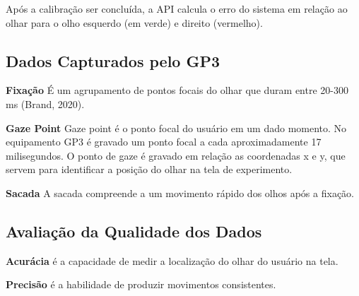 Após a calibração ser concluída, a API calcula o erro do sistema em relação ao olhar para o olho esquerdo (em verde) 
e direito (vermelho). 

\subsection{Dados Capturados pelo GP3}

\textbf{Fixação} É um agrupamento de pontos focais do olhar que duram entre 20-300 ms (Brand, 2020).

\textbf{Gaze Point} Gaze point é o ponto focal do usuário em um dado momento. No equipamento GP3 é gravado um ponto focal a cada aproximadamente 17 milisegundos.
O ponto de gaze é gravado em relação as coordenadas x e y, que servem para identificar a posição do olhar na tela de experimento. 

\textbf{Sacada} A sacada compreende a um movimento rápido dos olhos após a fixação.

\subsection{Avaliação da Qualidade dos Dados}

\textbf{Acurácia} é a capacidade de medir a localização do olhar do usuário na tela. 

\textbf{Precisão} é a habilidade de produzir movimentos consistentes. 



\subsection{}